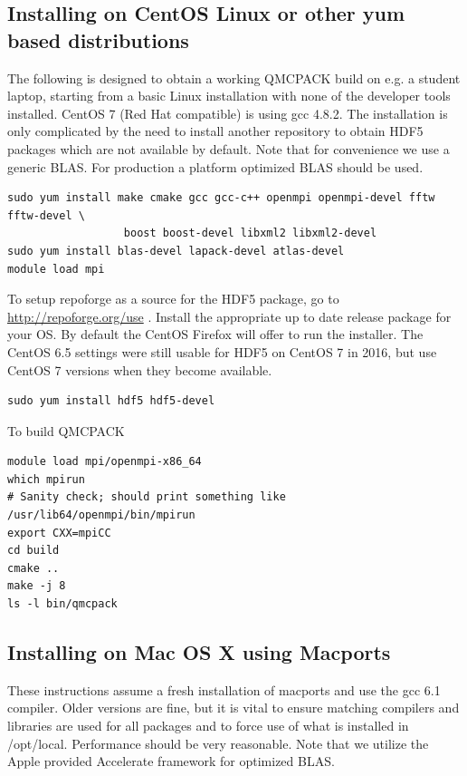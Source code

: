 \subsection{Installing on CentOS Linux or other yum based distributions}

The following is designed to obtain a working QMCPACK build on e.g. a
student laptop, starting from a basic Linux installation with none of
the developer tools installed. CentOS 7 (Red Hat compatible) is using
gcc 4.8.2. The installation is only complicated by the need to install
another repository to obtain HDF5 packages which are not available by
default. Note that for convenience we use a generic BLAS. For
production a platform optimized BLAS should be used.

\verbatimfont{\footnotesize}
\begin{verbatim}
sudo yum install make cmake gcc gcc-c++ openmpi openmpi-devel fftw fftw-devel \
                  boost boost-devel libxml2 libxml2-devel
sudo yum install blas-devel lapack-devel atlas-devel
module load mpi
\end{verbatim}

To setup repoforge as a source for the HDF5 package, go to
\url{http://repoforge.org/use} . Install the appropriate up to date
release package for your OS. By default the CentOS Firefox will offer
to run the installer. The CentOS 6.5 settings were still usable for HDF5 on
CentOS 7 in 2016, but use CentOS 7 versions when they become
available.

\verbatimfont{\footnotesize}
\begin{verbatim}
sudo yum install hdf5 hdf5-devel
\end{verbatim}

To build QMCPACK
\verbatimfont{\footnotesize}
\begin{verbatim}
module load mpi/openmpi-x86_64
which mpirun
# Sanity check; should print something like   /usr/lib64/openmpi/bin/mpirun
export CXX=mpiCC
cd build
cmake ..
make -j 8
ls -l bin/qmcpack
\end{verbatim}

\subsection{Installing on Mac OS X using Macports}
These instructions assume a fresh installation of macports
and use the gcc 6.1 compiler. Older versions are fine, but it is vital to ensure
matching compilers and libraries are used for all
packages and to force use of what is installed in /opt/local.  Performance should be very reasonable.
Note that we utilize the Apple provided Accelerate framework for
optimized BLAS.

